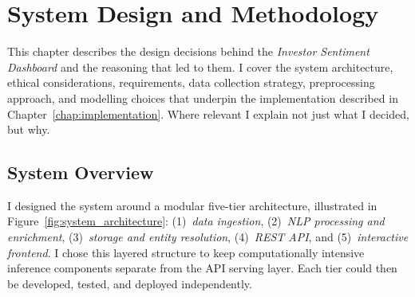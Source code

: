 \chapter{System Design and Methodology}
\label{chap:system_design}

This chapter describes the design decisions behind the \textit{Investor Sentiment Dashboard} and the reasoning that led to them. I cover the system architecture, ethical considerations, requirements, data collection strategy, preprocessing approach, and modelling choices that underpin the implementation described in Chapter~\ref{chap:implementation}. Where relevant I explain not just what I decided, but why.

\section{System Overview}
\label{sec:system_overview}

I designed the system around a modular five-tier architecture, illustrated in Figure~\ref{fig:system_architecture}: (1)~\textit{data ingestion}, (2)~\textit{NLP processing and enrichment}, (3)~\textit{storage and entity resolution}, (4)~\textit{REST API}, and (5)~\textit{interactive frontend}. I chose this layered structure to keep computationally intensive inference components separate from the API serving layer. Each tier could then be developed, tested, and deployed independently.

